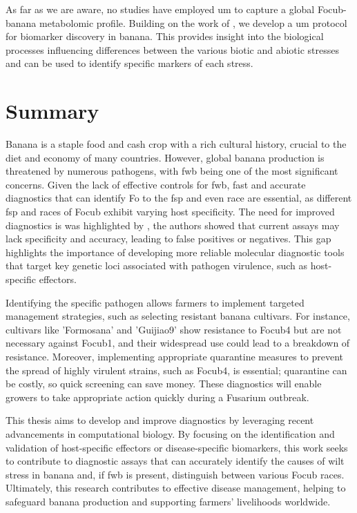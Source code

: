 As far as we are aware, no studies have employed \ac{um} to capture a global \ac{Focub}-banana metabolomic profile. Building on the work of \textcite{Sambles2017, Sidda2020}, we develop a \ac{um} protocol for biomarker discovery in banana. This provides insight into the biological processes influencing differences between the various biotic and abiotic stresses and can be used to identify specific markers of each stress.

\section{Summary}

Banana is a staple food and cash crop with a rich cultural history, crucial to the diet and economy of many countries. However, global banana production is threatened by numerous pathogens, with \ac{fwb} being one of the most significant concerns. Given the lack of effective controls for \ac{fwb}, fast and accurate diagnostics that can identify \ac{Fo} to the \ac{fsp} and even race are essential, as different \ac{fsp} and races of \ac{Focub} exhibit varying host specificity. The need for improved diagnostics is was highlighted by \textcite{Magdama2019}, the authors showed that current assays may lack specificity and accuracy, leading to false positives or negatives. This gap highlights the importance of developing more reliable molecular diagnostic tools that target key genetic loci associated with pathogen virulence, such as host-specific effectors.

Identifying the specific pathogen allows farmers to implement targeted management strategies, such as selecting resistant banana cultivars. For instance, cultivars like 'Formosana' and 'Guijiao9' show resistance to \ac{Focub4} but are not necessary against \ac{Focub1}, and their widespread use could lead to a breakdown of resistance. Moreover, implementing appropriate quarantine measures to prevent the spread of highly virulent strains, such as \ac{Focub4}, is essential; quarantine can be costly, so quick screening can save money. These diagnostics will enable growers to take appropriate action quickly during a Fusarium outbreak.

This thesis aims to develop and improve diagnostics by leveraging recent advancements in computational biology. By focusing on the identification and validation of host-specific effectors or disease-specific biomarkers, this work seeks to contribute to diagnostic assays that can accurately identify the causes of wilt stress in banana and, if \ac{fwb} is present, distinguish between various \ac{Focub} races. Ultimately, this research contributes to effective disease management, helping to safeguard banana production and supporting farmers' livelihoods worldwide.

